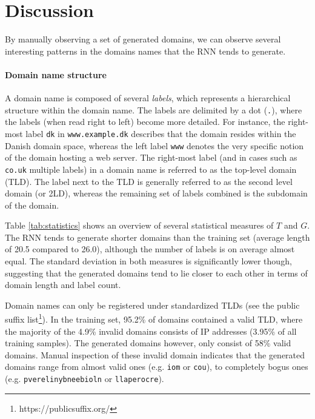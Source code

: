 \section{Discussion}
By manually observing a set of generated domains, we can observe several interesting patterns in the domains names that the RNN tends to generate.

\paragraph{Domain name structure}
A domain name is composed of several {\it labels}, which represents a hierarchical structure within the domain name.
The labels are delimited by a dot ({\tt .}), where the labels (when read right to left) become more detailed. 
For instance, the right-most label {\tt dk} in {\tt www.example.dk} describes that the domain resides within the Danish domain space, whereas the left label {\tt www} denotes the very specific notion of the domain hosting a web server.
The right-most label (and in cases such as {\tt co.uk} multiple labels) in a domain name is referred to as the top-level domain (TLD).
The label next to the TLD is generally referred to as the second level domain (or 2LD), whereas the remaining set of labels combined is the subdomain of the domain.

Table \ref{tab:statistics} shows an overview of several statistical measures of $T$ and $G$. 
The RNN tends to generate shorter domains than the training set (average length of 20.5 compared to 26.0), although the number of labels is on average almost equal.
The standard deviation in both measures is significantly lower though, suggesting that the generated domains tend to lie closer to each other in terms of domain length and label count.

Domain names can only be registered under standardized TLDs (see the public suffix list\footnote{https://publicsuffix.org/}).
In the training set, 95.2\% of domains contained a valid TLD, where the majority of the 4.9\% invalid domains consists of IP addresses (3.95\% of all training samples).
The generated domains however, only consist of 58\% valid domains. 
Manual inspection of these invalid domain indicates that the generated domains range from almost valid ones (e.g. {\tt iom} or {\tt cou}), to completely bogus ones (e.g. {\tt pverelinybneebioln} or {\tt llaperocre}).

